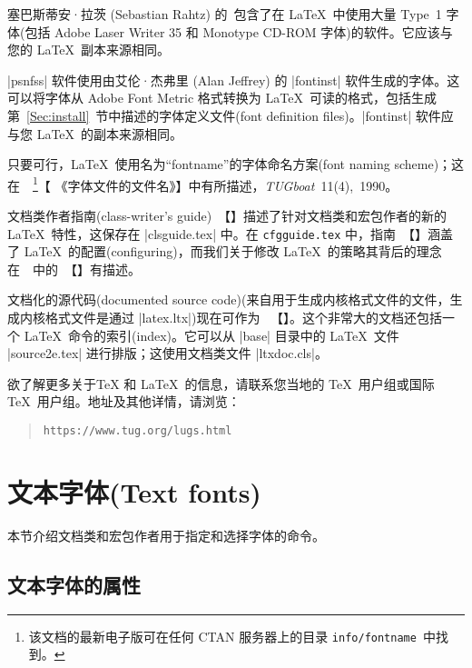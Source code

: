 \documentclass{ltxguide}[1995/11/28]
\newcommand{\heiti}{\CJKfamily{heiti}} %
\begin{document}
塞巴斯蒂安·拉茨 (Sebastian Rahtz) 的\ {\color{blue}{|psnfss| 软件}}包含了在 \LaTeX\ 中使用大量 Type~1 字体(包括 Adobe Laser Writer 35 和 Monotype CD-ROM 字体)的软件。它应该与您的 \LaTeX\ 副本来源相同。

|psnfss| 软件使用由艾伦·杰弗里 (Alan Jeffrey) 的 |fontinst| 软件生成的字体。这可以将字体从 Adobe Font Metric 格式转换为 \LaTeX\ 可读的格式，包括生成第~\ref{Sec:install}~节中描述的字体定义文件(font definition files)。|fontinst| 软件应与您 \LaTeX\ 的副本来源相同。

只要可行，\LaTeX{}\ 使用名为“fontname”的字体命名方案(font naming scheme)；这在\ {}\ \footnote{该文档的最新电子版可在任何 CTAN 服务器上的目录 \texttt{info/fontname}\ 中找到。}【{\color{blue} {《字体文件的文件名》}}】中有所描述，\emph{TUGboat}~11(4),~1990。

文档类作者指南(class-writer's guide)\ {\color{blue}{\emph{\clsguide}}}【{\color{blue}{《文档类和宏包作者的 \LaTeXe》}}】描述了针对文档类和宏包作者的新的 \LaTeX{}\ 特性，这保存在 |clsguide.tex| 中。在 \texttt{cfgguide.tex} 中，指南\ {\color{blue}{\emph{\cfgguide}}}【{\color{blue}{《\LaTeXe\ 的配置选项》}}】涵盖了 \LaTeX{}\ 的配置(configuring)，而我们关于修改 \LaTeX{}\ 的策略其背后的理念在\ {}\ 中的\  {\color{blue}{\emph{\modguide}}}【{}】有描述。

文档化的源代码(documented source code)(来自用于生成内核格式文件的文件，生成内核格式文件是通过 |latex.ltx|)现在可作为 {}\ 【{\color{blue}{《\LaTeXe\ 源代码》}}】。这个非常大的文档还包括一个 \LaTeX{}\ 命令的索引(index)。它可以从 |base| 目录中的 \LaTeX{}\ 文件 |source2e.tex| 进行排版；这使用文档类文件 |ltxdoc.cls|。

欲了解更多关于\TeX{} 和 \LaTeX{}\ 的信息，请联系您当地的 \TeX{}\ 用户组或国际 \TeX{}\ 用户组。地址及其他详情，请浏览：
\begin{quote}\small\label{addrs}
  \texttt{https://www.tug.org/lugs.html}
\end{quote}

\newpage

\section{\heiti 文本字体(Text fonts)}
\label{Sec:text}

本节介绍文档类和宏包作者用于指定和选择字体的命令。

\subsection[文本字体的属性]{\heiti 文本字体的属性}
\label{sec:textfontattributes}
\end{document}
